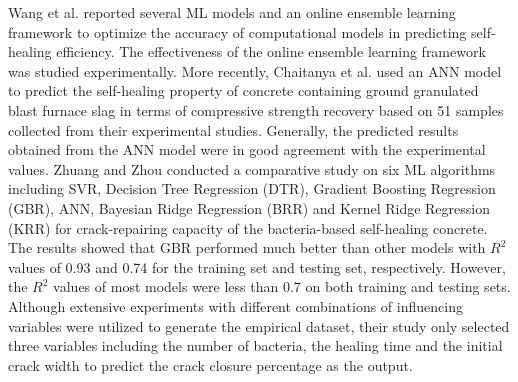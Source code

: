 \documentclass[11pt]{article}
\begin{document}
		
		
	
	Wang et al. \cite{wang2019towards} reported several ML models and an online ensemble learning framework to optimize the accuracy of computational models in predicting self-healing efficiency. The effectiveness of the online ensemble learning framework was studied experimentally. More recently, Chaitanya et al. \cite{chaitanya2020prediction} used an ANN model to predict the self-healing property of concrete containing ground granulated blast furnace slag in terms of compressive strength recovery based on 51 samples collected from their experimental studies. Generally, the  predicted  results  obtained  from  the  ANN model  were  in good agreement with the experimental values. Zhuang and Zhou \cite{zhuang2019prediction} conducted a comparative study on six ML algorithms including SVR, Decision Tree Regression (DTR), Gradient Boosting Regression (GBR), ANN, Bayesian Ridge Regression (BRR) and Kernel Ridge Regression (KRR) for crack-repairing capacity of the bacteria-based self-healing concrete. The results showed that GBR performed much better than other models with $R^2$ values of 0.93 and 0.74 for the training set and testing set, respectively. However, the $R^2$ values of most models were less than 0.7 on both training and testing sets. Although extensive experiments with different combinations of influencing variables were utilized to generate the empirical dataset, their study only selected three variables including the number of bacteria, the healing time and the initial crack width to predict the crack closure percentage as the output.
	
\end{document}

